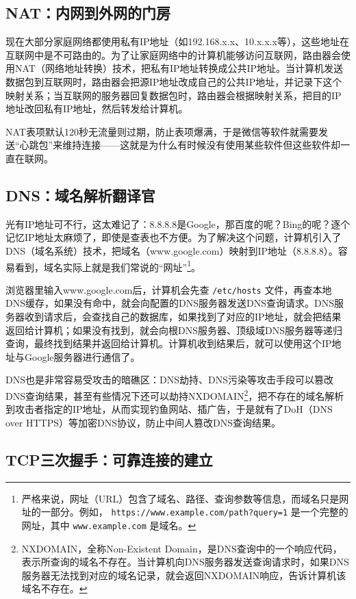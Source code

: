 \subsection{NAT：内网到外网的门房}

现在大部分家庭网络都使用私有IP地址（如192.168.x.x、10.x.x.x等），这些地址在互联网中是不可路由的。为了让家庭网络中的计算机能够访问互联网，路由器会使用NAT（网络地址转换）技术，把私有IP地址转换成公共IP地址。当计算机发送数据包到互联网时，路由器会把源IP地址改成自己的公共IP地址，并记录下这个映射关系；当互联网的服务器回复数据包时，路由器会根据映射关系，把目的IP地址改回私有IP地址，然后转发给计算机。

NAT表项默认120秒无流量则过期，防止表项爆满，于是微信等软件就需要发送“心跳包”来维持连接——这就是为什么有时候没有使用某些软件但这些软件却一直在联网。

\subsection{DNS：域名解析翻译官}

光有IP地址可不行，这太难记了：8.8.8.8是Google，那百度的呢？Bing的呢？逐个记忆IP地址太麻烦了，即使是查表也不方便。为了解决这个问题，计算机引入了DNS（域名系统）技术，把域名（www.google.com）映射到IP地址（8.8.8.8）。容易看到，域名实际上就是我们常说的“网址”\footnote{严格来说，网址（URL）包含了域名、路径、查询参数等信息，而域名只是网址的一部分。例如， \texttt{https://www.example.com/path?query=1} 是一个完整的网址，其中 \texttt{www.example.com} 是域名。}。

浏览器里输入www.google.com后，计算机会先查 \texttt{/etc/hosts} 文件，再查本地DNS缓存，如果没有命中，就会向配置的DNS服务器发送DNS查询请求。DNS服务器收到请求后，会查找自己的数据库，如果找到了对应的IP地址，就会把结果返回给计算机；如果没有找到，就会向根DNS服务器、顶级域DNS服务器等递归查询，最终找到结果并返回给计算机。计算机收到结果后，就可以使用这个IP地址与Google服务器进行通信了。

DNS也是非常容易受攻击的暗礁区：DNS劫持、DNS污染等攻击手段可以篡改DNS查询结果，甚至有些情况下还可以劫持NXDOMAIN\footnote{NXDOMAIN，全称Non-Existent Domain，是DNS查询中的一个响应代码，表示所查询的域名不存在。当计算机向DNS服务器发送查询请求时，如果DNS服务器无法找到对应的域名记录，就会返回NXDOMAIN响应，告诉计算机该域名不存在。}，把不存在的域名解析到攻击者指定的IP地址，从而实现钓鱼网站、插广告，于是就有了DoH（DNS over HTTPS）等加密DNS协议，防止中间人篡改DNS查询结果。

\subsection{TCP三次握手：可靠连接的建立}

